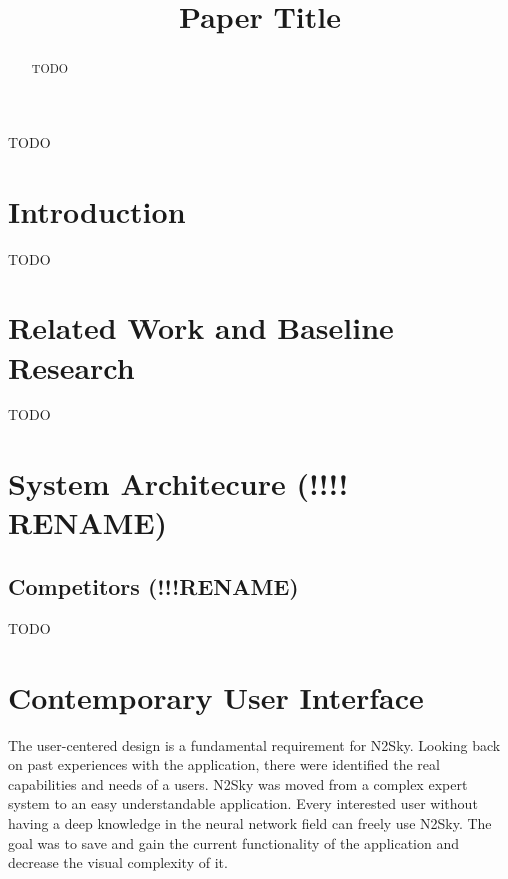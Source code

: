 \documentclass[conference]{IEEEtran}
\begin{document}
\title{Paper Title\\}

\author{
\and
{}
\and
{}
}

\maketitle

\begin{abstract}
 TODO
\end{abstract}

\begin{IEEEkeywords}
TODO
\end{IEEEkeywords}

\section{Introduction}
TODO

\section{Related Work and Baseline Research}
TODO

\section{System Architecure (!!!! RENAME)}
\subsection{Competitors (!!!RENAME)}
TODO

\section{Contemporary User Interface}

The user-centered design is a fundamental requirement for N2Sky. Looking back on past experiences with the application, there were identified the real capabilities and needs of a users. N2Sky was moved from a complex expert system to an easy understandable application. Every interested user without having a deep knowledge in the neural network field can freely use N2Sky.  The goal was to save and gain the current functionality of the application and decrease the visual complexity of it. 
\end{document}
